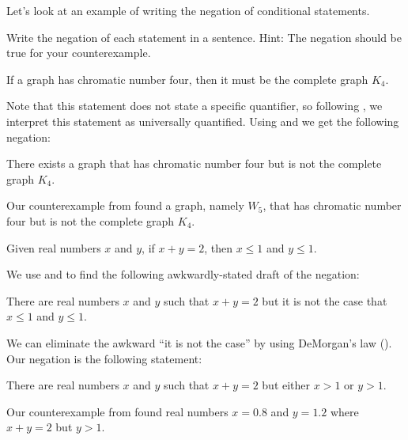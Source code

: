 Let's look at an example of writing the negation of conditional statements.

\begin{exam}
\label{exam_neg_ifthen}
Write the negation of each statement in a sentence.  Hint: The negation should be true for your counterexample.
    \begin{apart}
        \item If a graph has chromatic number four, then it must be the complete graph $K_4$.
            \begin{soln}
                Note that this statement does not state a specific quantifier, so following , we interpret this statement as universally quantified.  Using  and  we get the following negation:
                    \begin{center}
                        There exists a graph that has chromatic number four but is not the complete graph $K_4$.
                    \end{center}
                Our counterexample from  found a graph, namely $W_5$, that has chromatic number four but is not the complete graph $K_4$. 
            \end{soln}
        \item Given real numbers $x$ and $y$, if $x + y = 2$, then $x \le 1$ and $y \le 1$.
            \begin{soln}
                We use  and  to find the following awkwardly-stated draft of the negation:
                    \begin{center}
                        There are real numbers $x$ and $y$ such that $x+y=2$ but it is not the case that $x \le 1$ and $y \le 1$.
                    \end{center}
                We can eliminate the awkward ``it is not the case'' by using DeMorgan's law ().  Our negation is the following statement:
                    \begin{center}
                        There are real numbers $x$ and $y$ such that $x+y=2$ but either $x > 1$ or $y > 1$.                                        
                    \end{center}
                Our counterexample from  found real numbers $x = 0.8$ and $y = 1.2$ where $x+y=2$ but $y > 1$.
            \end{soln}

\end{apart}
\end{exam}
